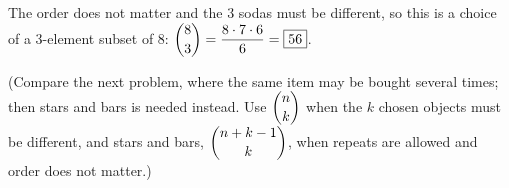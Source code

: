 The order does not matter and the $3$ sodas must be different, so this is a choice of a $3$-element subset of $8$: $\dbinom83=\dfrac{8\cdot7\cdot6}{6}=\boxed{56}$.

(Compare the next problem, where the same item may be bought several times; then stars and bars is needed instead. Use $\dbinom nk$ when the $k$ chosen objects must be different, and stars and bars, $\dbinom{n+k-1}{k}$, when repeats are allowed and order does not matter.)
